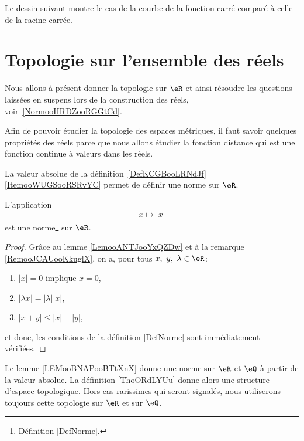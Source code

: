 Le dessin suivant montre le cas de la courbe de la fonction carré comparé à celle de la racine carrée.
\begin{center}
   
\end{center}


\section{Topologie sur l'ensemble des réels}
\label{SECooGKHYooMwHQaD}

Nous allons à présent donner la topologie sur \( \eR\) et ainsi résoudre les questions laissées en suspens lors de la construction des réels, voir~\ref{NormooHRDZooRGGtCd}.


Afin de pouvoir étudier la topologie des espaces métriques, il faut savoir quelques propriétés des réels parce que nous allons étudier la fonction distance qui est une fonction continue à valeurs dans les réels.

La valeur absolue de la définition~\ref{DefKCGBooLRNdJf}\ref{ItemooWUGSooRSRvYC} permet de définir une norme sur \( \eR\).
\begin{lemma}       \label{LEMooBNAPooBTtXnX}
    L'application
    \begin{equation}
         x\mapsto | x |
    \end{equation}
    est une norme\footnote{Définition \ref{DefNorme}.} sur $\eR$.
\end{lemma}

\begin{proof}
  Grâce au lemme \ref{LemooANTJooYxQZDw} et à la remarque \ref{RemooJCAUooKkuglX}, on a, pour tous \(x,\ y,\ \lambda \in \eR \):
\begin{enumerate}
\item $| x |=0$ implique $x=0$,
\item $| \lambda x |=| \lambda | |x |$,
\item $| x+y |\leq | x |+| y |$,
\end{enumerate}
et donc, les conditions de la définition \ref{DefNorme} sont immédiatement vérifiées.
\end{proof}

\begin{definition}      \label{DEFooNYGIooVGHSIA}
    Le lemme \ref{LEMooBNAPooBTtXnX} donne une norme sur \( \eR\) et \( \eQ\) à partir de la valeur absolue. La définition \ref{ThoORdLYUu} donne alors une structure d'espace topologique. Hors cas rarissimes qui seront signalés, nous utiliserons toujours cette topologie sur \( \eR\) et sur \( \eQ\).

\end{definition}

